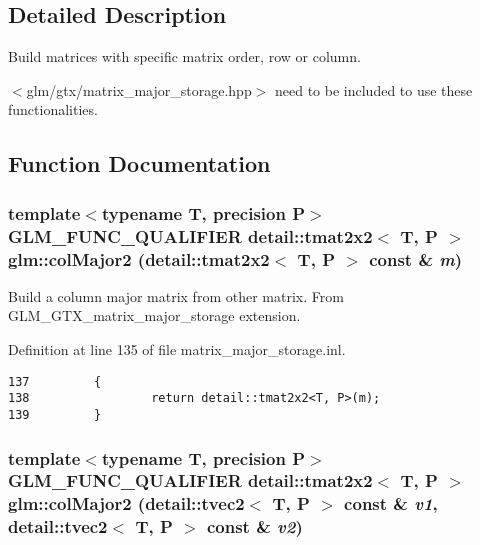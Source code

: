 \subsection{Detailed Description}
Build matrices with specific matrix order, row or column. 

$<$glm/gtx/matrix\_\-major\_\-storage.hpp$>$ need to be included to use these functionalities. 

\subsection{Function Documentation}
\hypertarget{group__gtx__matrix__major__storage_g095b6bfd85a85c3a0878b86363e3d0aa}{
\subsubsection[colMajor2]{\setlength{\rightskip}{0pt plus 5cm}template$<$typename T, precision P$>$ GLM\_\-FUNC\_\-QUALIFIER detail::tmat2x2$<$ T, P $>$ glm::colMajor2 (detail::tmat2x2$<$ T, P $>$ const \& {\em m})}}
\label{group__gtx__matrix__major__storage_g095b6bfd85a85c3a0878b86363e3d0aa}


Build a column major matrix from other matrix. From GLM\_\-GTX\_\-matrix\_\-major\_\-storage extension. 

Definition at line 135 of file matrix\_\-major\_\-storage.inl.

\begin{Code}\begin{verbatim}137         {
138                 return detail::tmat2x2<T, P>(m);
139         }
\end{verbatim}
\end{Code}


\hypertarget{group__gtx__matrix__major__storage_g3e3ecc119e43821d7ac582124ef891cb}{
\subsubsection[colMajor2]{\setlength{\rightskip}{0pt plus 5cm}template$<$typename T, precision P$>$ GLM\_\-FUNC\_\-QUALIFIER detail::tmat2x2$<$ T, P $>$ glm::colMajor2 (detail::tvec2$<$ T, P $>$ const \& {\em v1}, \/  detail::tvec2$<$ T, P $>$ const \& {\em v2})}}
\label{group__gtx__matrix__major__storage_g3e3ecc119e43821d7ac582124ef891cb}


